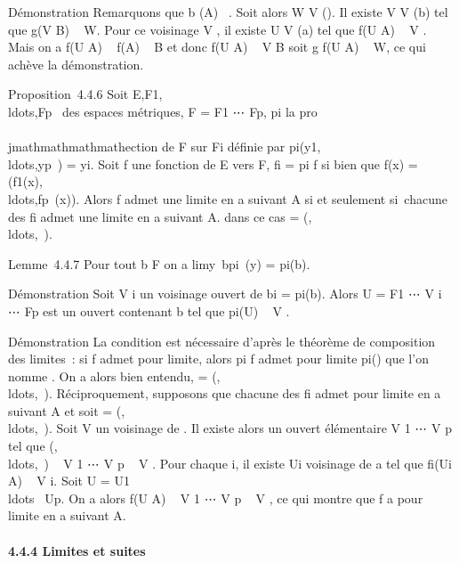 Démonstration Remarquons que b \in\overlinef(A)
\subset~\overlineB. Soit alors W \in V (\ell). Il existe V \in V
(b) tel que g(V \bigcap B) \subset~ W. Pour ce voisinage V , il existe U \in V (a) tel
que f(U \bigcap A) \subset~ V . Mais on a f(U \bigcap A) \subset~ f(A) \subset~ B et donc f(U \bigcap A) \subset~ V \bigcap
B soit g \cdot f(U \bigcap A) \subset~ W, ce qui achève la démonstration.

Proposition~4.4.6 Soit
E,F1,\\ldots,Fp~
des espaces métriques, F = F1 \times⋯ \times
Fp, pi la pro\\\\jmathmathmathmathection de F sur Fi définie
par
pi(y1,\\ldots,yp~)
= yi. Soit f une fonction de E vers F, fi =
pi \cdot f si bien que f(x) =
(f1(x),\\ldots,fp~(x)).
Alors f admet une limite \ell en a suivant A si et seulement si~chacune des
fi admet une limite \elli en a suivant A. dans ce cas \ell
=
(,\\ldots,\ellp~).

Lemme~4.4.7 Pour tout b \in F on a
limy\rightarrow~bpi~(y) =
pi(b).

Démonstration Soit V i un voisinage ouvert de bi =
pi(b). Alors U = F1 \times⋯ \times
V i \times⋯ \times Fp est un ouvert
contenant b tel que pi(U) \subset~ V .

Démonstration La condition est nécessaire d'après le théorème de
composition des limites~: si f admet \ell pour limite, alors pi \cdot
f admet pour limite pi(\ell) que l'on nomme \elli. On a
alors bien entendu, \ell =
(,\\ldots,\ellp~).
Réciproquement, supposons que chacune des fi admet
\elli pour limite en a suivant A et soit \ell =
(,\\ldots,\ellp~).
Soit V un voisinage de \ell. Il existe alors un ouvert élémentaire V
1 \times⋯ \times V p tel que
(,\\ldots,\ellp~)
\subset~ V 1 \times⋯ \times V p \subset~ V . Pour
chaque i, il existe Ui voisinage de a tel que
fi(Ui \bigcap A) \subset~ V i. Soit U = U1
\bigcap\\ldots~ \bigcap
Up. On a alors f(U \bigcap A) \subset~ V 1
\times⋯ \times V p \subset~ V , ce qui montre que f
a \ell pour limite en a suivant A.

\paragraph{4.4.4 Limites et suites}

